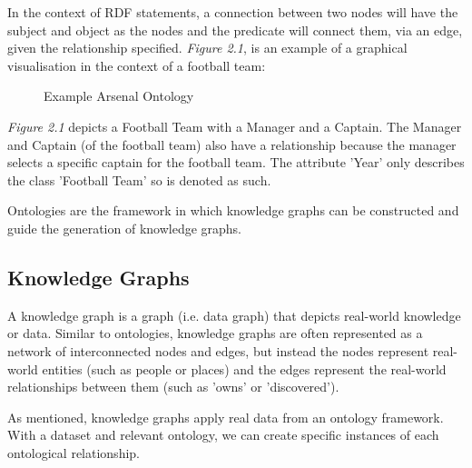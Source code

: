 In the context of RDF statements, a connection between two nodes will have the subject and object as the nodes and the predicate will connect them, via an edge, given the relationship specified. \textit{Figure 2.1}, is an example of a graphical visualisation in the context of a football team:

\begin{figure}
\begin{center}
\end{center}
\caption{Example Arsenal Ontology}
\end{figure}

\textit{Figure 2.1} depicts a Football Team with a Manager and a Captain. The Manager and Captain (of the football team) also have a relationship because the manager selects a specific captain for the football team. The attribute 'Year' only describes the class 'Football Team' so is denoted as such.

Ontologies are the framework in which knowledge graphs can be constructed and guide the generation of knowledge graphs. 

\subsection{Knowledge Graphs}
\hspace{0.5cm} A knowledge graph is a graph (i.e. data graph) that depicts real-world knowledge or data. \cite{knowledgegraph} Similar to ontologies, knowledge graphs are often represented as a network of interconnected nodes and edges, but instead the nodes represent real-world entities (such as people or places) and the edges represent the real-world relationships between them (such as 'owns' or 'discovered'). 

As mentioned, knowledge graphs apply real data from an ontology framework. With a dataset and relevant ontology, we can create specific instances of each ontological relationship. 

